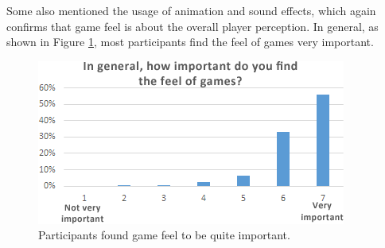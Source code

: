 Some also mentioned the usage of animation and sound effects, which again confirms that game feel is about the overall player perception. In general, as shown in Figure \ref{fig:games_important}, most participants find the feel of games very important.

\begin{figure}[htbp]
\centering
\includegraphics[width=0.9\columnwidth]{Pics/games_important}
\caption{Participants found game feel to be quite important.}
\label{fig:games_important}
\end{figure}